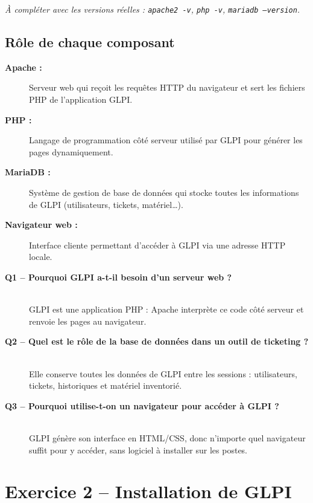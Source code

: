 \documentclass[a4paper,11pt]{article}
\begin{document}
\textit{À compléter avec les versions réelles : \texttt{apache2 -v}, \texttt{php -v}, \texttt{mariadb --version}.}

\subsection{Rôle de chaque composant}

\begin{description}
    \item[\textbf{Apache :}] Serveur web qui reçoit les requêtes HTTP du navigateur et sert les fichiers PHP de l'application GLPI.
    \item[\textbf{PHP :}] Langage de programmation côté serveur utilisé par GLPI pour générer les pages dynamiquement.
    \item[\textbf{MariaDB :}] Système de gestion de base de données qui stocke toutes les informations de GLPI (utilisateurs, tickets, matériel\ldots).
    \item[\textbf{Navigateur web :}] Interface cliente permettant d'accéder à GLPI via une adresse HTTP locale.
\end{description}

\begin{qabox}
\begin{description}
    \item[\textbf{Q1 -- Pourquoi GLPI a-t-il besoin d'un serveur web ?}]~\\
    GLPI est une application PHP : Apache interprète ce code côté serveur et renvoie les pages au navigateur.

    \item[\textbf{Q2 -- Quel est le rôle de la base de données dans un outil de ticketing ?}]~\\
    Elle conserve toutes les données de GLPI entre les sessions : utilisateurs, tickets, historiques et matériel inventorié.

    \item[\textbf{Q3 -- Pourquoi utilise-t-on un navigateur pour accéder à GLPI ?}]~\\
    GLPI génère son interface en HTML/CSS, donc n'importe quel navigateur suffit pour y accéder, sans logiciel à installer sur les postes.
\end{description}
\end{qabox}

\newpage

\section{Exercice 2 -- Installation de GLPI}
\end{document}
